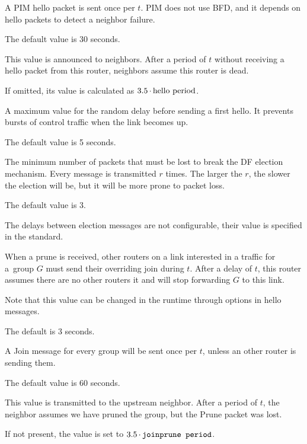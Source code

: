 \begin{description}[style=nextline]
  A PIM hello packet is sent once per $t$. PIM does not use BFD, and it depends
  on hello packets to detect a neighbor failure.

  The default value is 30 seconds.

  This value is announced to neighbors. After a period of $t$ without receiving
  a hello packet from this router, neighbors assume this router is dead.

  If omitted, its value is calculated as $3.5\mathop{\cdot}\hbox{hello period}$.

  A maximum value for the random delay before sending a first hello. It
  prevents bursts of control traffic when the link becomes up.

  The default value is 5 seconds.

  The minimum number of packets that must be lost to break the DF election
  mechanism. Every message is transmitted $r$ times. The larger the $r$, the
  slower the election will be, but it will be more prone to packet loss.

  The default value is 3.

  The delays between election messages are not configurable, their value is
  specified in the standard.

  When a prune is received, other routers on a link interested in a traffic for
  a~group $G$ must send their overriding join during $t$. After a delay of $t$, this
  router assumes there are no other routers it and will stop forwarding $G$ to this
  link.

  Note that this value can be changed in the runtime through options in hello
  messages.

  The default is 3 seconds.

  A Join message for every group will be sent once per $t$, unless an other router
  is sending them.

  The default value is 60 seconds.

  This value is transmitted to the upstream neighbor. After a period of $t$,
  the neighbor assumes we have pruned the group, but the Prune packet was
  lost.

  If not present, the value is set to $3.5\mathop{\cdot}\texttt{joinprune period}$.
\end{description}

